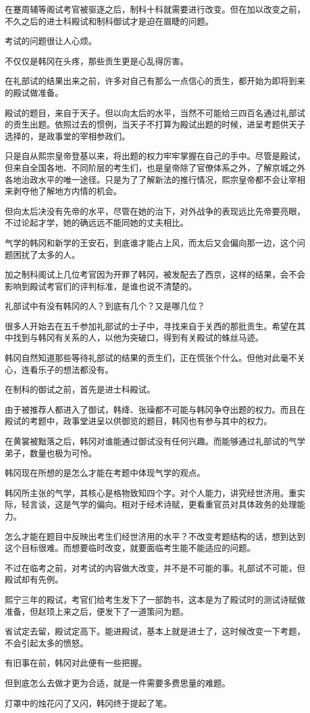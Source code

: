 在蹇周辅等阁试考官被驱逐之后，制科十科就需要进行改变。但在加以改变之前，不久之后的进士科殿试和制科御试才是迫在眉睫的问题。

考试的问题很让人心烦。

不仅仅是韩冈在头疼，那些贡生更是心乱得厉害。

在礼部试的结果出来之前，许多对自己有那么一点信心的贡生，都开始为即将到来的殿试做准备。

殿试的题目，来自于天子。但以向太后的水平，当然不可能给三四百名通过礼部试的贡生出题。依照过去的惯例，当天子不打算为殿试出题的时候，进呈考题供天子选择的，是政事堂的宰相参政们。

只是自从熙宗皇帝登基以来，将出题的权力牢牢掌握在自己的手中。尽管是殿试，但来自全国各地、不同阶层的考生们，也是皇帝除了官僚体系之外，了解京城之外各地治政水平的唯一途径。只是为了了解新法的推行情况，熙宗皇帝都不会让宰相来剥夺他了解地方内情的机会。

但向太后决没有先帝的水平，尽管在她的治下，对外战争的表现远比先帝要亮眼，不过论起才学，她的确远远不能同她的丈夫相比。

气学的韩冈和新学的王安石，到底谁才能占上风，而太后又会偏向那一边，这个问题困扰了太多的人。

加之制科阁试上几位考官因为开罪了韩冈，被发配去了西京，这样的结果，会不会影响到殿试考官们的评判标准，是谁也说不清楚的。

礼部试中有没有韩冈的人？到底有几个？又是哪几位？

很多人开始去在五千参加礼部试的士子中，寻找来自于关西的那批贡生。希望在其中找到与韩冈有关系的人，以他为突破口，得到有关殿试的蛛丝马迹。

韩冈自然知道那些等待礼部试的结果的贡生们，正在慌张个什么。但他对此毫不关心，连看乐子的想法都没有。

在制科的御试之前，首先是进士科殿试。

由于被推荐人都进入了御试，韩绛、张璪都不可能与韩冈争夺出题的权力。而且在殿试的考题中，政事堂进呈以供御览的题目，韩冈也有参与其中的权力。

在黄裳被黜落之后，韩冈对谁能通过御试没有任何兴趣。而能够通过礼部试的气学弟子，数量也极为可怜。

韩冈现在所想的是怎么才能在考题中体现气学的观点。

韩冈所主张的气学，其核心是格物致知四个字。对个人能力，讲究经世济用。重实际，轻言谈，这是气学的偏向。相对于经术诗赋，更看重官员对具体政务的处理能力。

怎么才能在题目中反映出考生们经世济用的水平？不改变考题结构的话，想到达到这个目标很难。而想要临时改变，就要面临考生能不能适应的问题。

不过在临考之前，对考试的内容做大改变，并不是不可能的事。礼部试不可能，但殿试却有先例。

熙宁三年的殿试，考官们给考生发下了一部韵书，这本是为了殿试时的测试诗赋做准备，但赵顼上来之后，便发下了一道策问为题。

省试定去留，殿试定高下。能进殿试，基本上就是进士了，这时候改变一下考题，不会引起太多的愤怒。

有旧事在前，韩冈对此便有一些把握。

但到底怎么去做才更为合适，就是一件需要多费思量的难题。

灯罩中的烛花闪了又闪，韩冈终于提起了笔。
